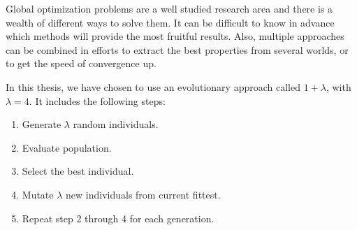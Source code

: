 Global optimization problems are a well studied research area and there is a
wealth of different ways to solve them. It can be difficult to know in advance
which methods will provide the most fruitful results. Also, multiple approaches
can be combined in efforts to extract the best properties from several worlds,
or to get the speed of convergence up.

In this thesis, we have chosen to use an evolutionary approach called $1 +
\lambda$, with $\lambda = 4$. It includes the following steps:

\begin{enumerate}
    \item Generate $\lambda$ random individuals.
    \item Evaluate population.
    \item Select the best individual.
    \item Mutate $\lambda$ new individuals from current fittest.
    \item Repeat step 2 through 4 for each generation.
\end{enumerate}

